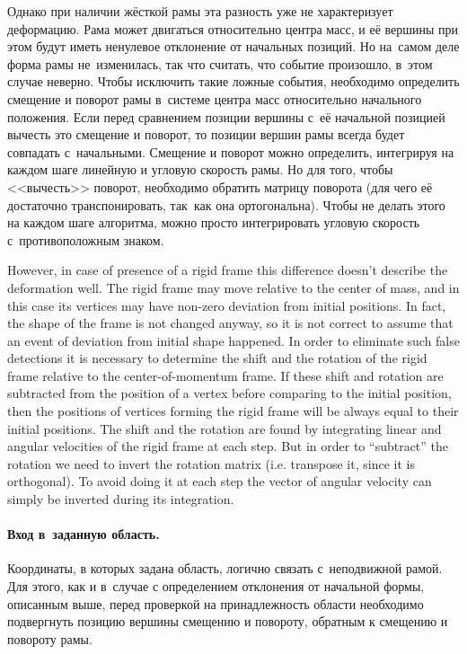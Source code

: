\documentclass[a4paper, 12pt, titlepage]{extarticle}
\begin{document}
\begin{original}
        Однако при наличии жёсткой рамы эта разность уже не характеризует деформацию. Рама может
        двигаться относительно центра масс, и её вершины при этом будут иметь ненулевое отклонение
        от начальных позиций. Но на~самом деле форма рамы не~изменилась, так что считать, что событие
        произошло, в~этом случае неверно. Чтобы исключить такие ложные события, необходимо определить смещение и поворот
        рамы в~системе центра масс относительно начального положения. Если перед сравнением позиции
        вершины с~её начальной позицией вычесть это смещение и поворот, то позиции вершин рамы
        всегда будет совпадать с~начальными. Смещение и поворот можно определить, интегрируя на
        каждом шаге линейную и угловую скорость рамы. Но для того, чтобы <<вычесть>> поворот,
        необходимо обратить матрицу поворота (для чего её достаточно транспонировать, так~как она
        ортогональна). Чтобы не делать этого на каждом шаге алгоритма, можно просто интегрировать угловую
        скорость с~противоположным знаком.
\end{original}

        However, in case of presence of a rigid frame this difference doesn't describe the
        deformation well. The rigid frame may move relative to the center of mass, and in this case
        its vertices may have non-zero deviation from initial positions. In fact, the shape of the
        frame is not changed anyway, so it is not correct to assume that an event of deviation from
        initial shape happened. In order to eliminate such false detections it is necessary to
        determine the shift and the rotation of the rigid frame relative to the center-of-momentum
        frame.  If these shift and rotation are subtracted from the position of a vertex before
        comparing to the initial position, then the positions of vertices forming the rigid frame
        will be always equal to their initial positions. The shift and the rotation are found by
        integrating linear and angular velocities of the rigid frame at each step. But in order to
        ``subtract'' the rotation we need to invert the rotation matrix (i.e. transpose it, since it
        is orthogonal). To avoid doing it at each step the vector of angular velocity can simply be
        inverted during its integration.

\begin{original}
        \paragraph{Вход в~заданную область.}
        Координаты, в которых задана область, логично связать с~неподвижной рамой. Для этого, как и
        в~случае с определением отклонения от начальной формы, описанным выше, перед проверкой на принадлежность
        области необходимо подвергнуть позицию вершины смещению и повороту, обратным к смещению и
        повороту рамы.
\end{original}
\end{document}
